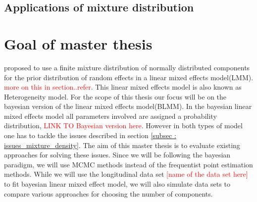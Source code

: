 \subsection{Applications of mixture distribution}

\section{Goal of master thesis}
\label{sec : goal}
\citet*{verbeke_linear_1996} proposed to use a finite mixture distribution of normally distributed components for the prior distribution of random effects in a linear mixed effects model(LMM). \textcolor{red}{more on this in section..refer}. This linear mixed effects model is also known as Heterogeneity model. For the scope of this thesis our focus will be on the bayesian version of the linear mixed effects model(BLMM). In the bayesian linear mixed effects model all parameters involved are assigned a probability distribution, \textcolor{red}{LINK TO Bayesian version here}. However in both types of model one has to tackle the issues described in section \ref{subsec : issues_mixture_density}. The aim of this master thesis is to evaluate existing approaches for solving these issues. Since we will be following the bayesian paradigm, we will use MCMC methods instead of the frequentist point estimation methods. While we will use the longitudinal data set \textcolor{red}{[name of the data set here]} to fit bayesian linear mixed effect model, we will also simulate data sets to compare various approaches for choosing the number of components.